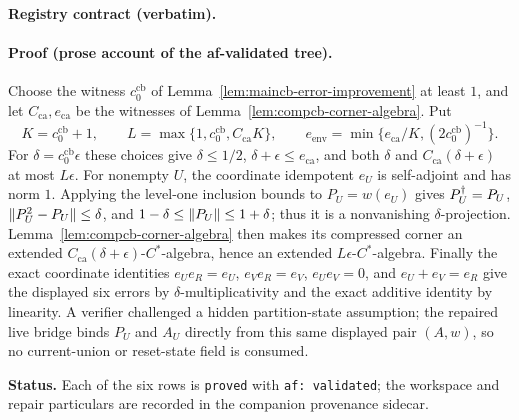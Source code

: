 \noindent\textbf{Registry contract (verbatim).}

\paragraph{Proof (prose account of the af-validated tree).}
Choose the witness $c_{0}^{\mathrm{cb}}$ of
Lemma~\ref{lem:maincb-error-improvement} at least $1$, and let
$C_{\mathrm{ca}},e_{\mathrm{ca}}$ be the witnesses of
Lemma~\ref{lem:compcb-corner-algebra}.  Put
\[
 K=c_{0}^{\mathrm{cb}}+1,\qquad
 L=\max\{1,c_{0}^{\mathrm{cb}},C_{\mathrm{ca}}K\},\qquad
 e_{\mathrm{env}}=\min\{e_{\mathrm{ca}}/K,(2c_{0}^{\mathrm{cb}})^{-1}\}.
\]
For $\delta=c_{0}^{\mathrm{cb}}\epsilon$ these choices give
$\delta\le1/2$, $\delta+\epsilon\le e_{\mathrm{ca}}$, and both
$\delta$ and $C_{\mathrm{ca}}(\delta+\epsilon)$ at most $L\epsilon$.
For nonempty $U$, the coordinate idempotent $e_U$ is self-adjoint and has norm
$1$.  Applying the level-one inclusion bounds to $P_U=w(e_U)$ gives
$P_U^{\dagger}=P_U$, $\lVert P_U^2-P_U\rVert\le\delta$, and
$1-\delta\le\lVert P_U\rVert\le1+\delta$; thus it is a nonvanishing
$\delta$-projection.  Lemma~\ref{lem:compcb-corner-algebra} then makes its
compressed corner an extended $C_{\mathrm{ca}}(\delta+\epsilon)$-$C^{*}$-algebra,
hence an extended $L\epsilon$-$C^{*}$-algebra.  Finally the exact coordinate
identities $e_Ue_R=e_U$, $e_Ve_R=e_V$, $e_Ue_V=0$, and $e_U+e_V=e_R$
give the displayed six errors by $\delta$-multiplicativity and the exact additive
identity by linearity.  A verifier challenged a hidden partition-state assumption;
the repaired live bridge binds $P_U$ and $A_U$ directly from this same displayed
pair $(A,w)$, so no current-union or reset-state field is consumed.

\medskip
\noindent\textbf{Status.} Each of the six rows is \texttt{proved} with
\texttt{af: validated}; the workspace and repair particulars are recorded in the
companion provenance sidecar.
